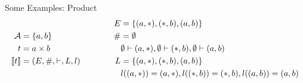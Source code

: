 \begin{frame}{Some Examples: Product}
    \begin{equation*}
        \begin{aligned}
            \mathcal{A} & = \{a,b\}           \\
            t           & = a \times b        \\
            \llbracket t \rrbracket     & = (E,\#,\vdash,L,l) \\
        \end{aligned}
        \qquad \qquad
        \begin{aligned}
            E  & = \{(a,*),(*,b),(a,b)\}                           \\
            \# & = \emptyset                                              \\
               & \emptyset \vdash (a,*), \emptyset \vdash (*,b),\emptyset \vdash (a,b)  \\
            L  & = \{(a,*),(*,b),(a,b)\}                           \\
               & l((a,*)) = (a,*), l((*,b)) = (*,b),l((a,b))=(a,b) \\
        \end{aligned}
    \end{equation*}
    \begin{align*}
    \end{align*}
    \begin{center}
    \end{center}
\end{frame}

